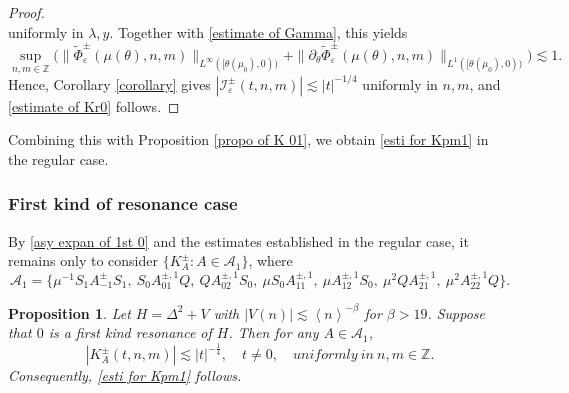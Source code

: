 \documentclass[reqno, 11pt]{amsart}
\newtheorem{proposition}[definition]{Proposition}
\newcommand\Z{\mathbb{Z}}
\newcommand\mcaI{\mathcal{I}}
\newcommand\mcaA{\mathcal{A}}
\numberwithin{equation}{section}
\begin{document}
\begin{proof}
\begin{equation*}
\end{equation*}
uniformly in $\lambda,y$. Together with \eqref{estimate of Gamma}, this yields
\begin{equation*}
\sup\limits_{n,m\in\Z}
\big(
\|\widetilde\Phi^{\pm}_\varepsilon(\mu(\theta),n,m)\|_{L^\infty([\theta(\mu_0),0))}
+
\|\partial_\theta
\widetilde\Phi^{\pm}_\varepsilon(\mu(\theta),n,m)\|_{L^1([\theta(\mu_0),0))}
\big)
\lesssim1.
\end{equation*}
Hence, Corollary \ref{corollary} gives $|\mcaI^{\pm}_{\varepsilon}(t,n,m)|\lesssim|t|^{-1/4}$ uniformly in $n,m$, and \eqref{estimate of Kr0} follows. 
\end{proof}
Combining this 
with Proposition \ref{propo of K 01}, we obtain \eqref{esti for Kpm1} in the regular case.
\subsubsection{{\bf {First kind of resonance case}}}
By \eqref{asy expan of 1st 0} and the estimates established in the regular case, it remains only to consider $\{K^{\pm}_A:A\in\mcaA_1\}$, where
$$\mcaA_1=\{\mu^{-1}S_{1}A^{\pm}_{-1}S_{1},\ S_0A^{\pm,1}_{01}Q,\ QA^{\pm,1}_{02}S_0,\ \mu S_0A^{\pm,1}_{11},\ \mu A^{\pm,1}_{12}S_0,\ \mu^2QA^{\pm,1}_{21},\ \mu^2A^{\pm,1}_{22}Q\}.$$ 
\begin{proposition}\label{propo of KB 0 1st}
Let $H=\Delta^2+V$ with $|V(n)|\lesssim \left<n\right>^{-\beta}$ for $\beta>19$. Suppose that $0$ is a first kind resonance of $H$. Then for any $A\in\mcaA_1$, 
\begin{equation}\label{estimate of KB 0 1st}
|K^{\pm}_A(t,n,m)|\lesssim |t|^{-\frac{1}{4}},\quad t\neq0,\quad uniformly\  in\  n,m\in\Z.
\end{equation}
Consequently, \eqref{esti for Kpm1} follows.
\end{proposition}
\end{document}
